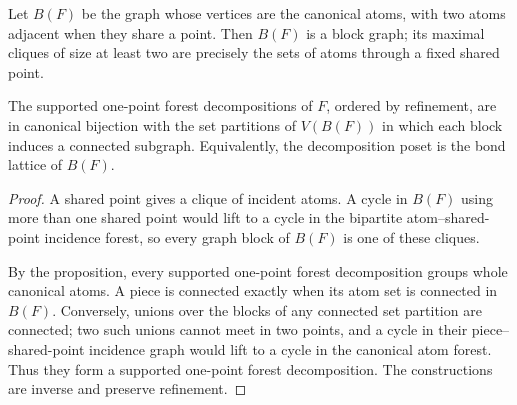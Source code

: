 \begin{corollary}
\label{corollary-canonical-decomposition-lattice}
Let $B(F)$ be the graph whose vertices are the canonical atoms, with two atoms
adjacent when they share a point.  Then $B(F)$ is a block graph; its maximal
cliques of size at least two are precisely the sets of atoms through a fixed
shared point.

The supported one-point forest decompositions of $F$, ordered by refinement,
are in canonical bijection with the set partitions of $V(B(F))$ in which
each block induces a connected subgraph.  Equivalently, the decomposition
poset is the bond lattice of $B(F)$.
\end{corollary}

\begin{proof}
A shared point gives a clique of incident atoms.  A cycle in $B(F)$ using
more than one shared point would lift to a cycle in the bipartite
atom--shared-point incidence forest, so every graph block of $B(F)$ is one of
these cliques.

By the proposition, every supported one-point forest decomposition groups
whole canonical atoms.  A piece is connected exactly when its atom set is
connected in $B(F)$.  Conversely, unions over the blocks of any connected set
partition are connected; two such unions cannot meet in two points, and a
cycle in their piece--shared-point incidence graph would lift to a cycle in
the canonical atom forest.  Thus they form a supported one-point forest
decomposition.  The constructions are inverse and preserve refinement.
\end{proof}
